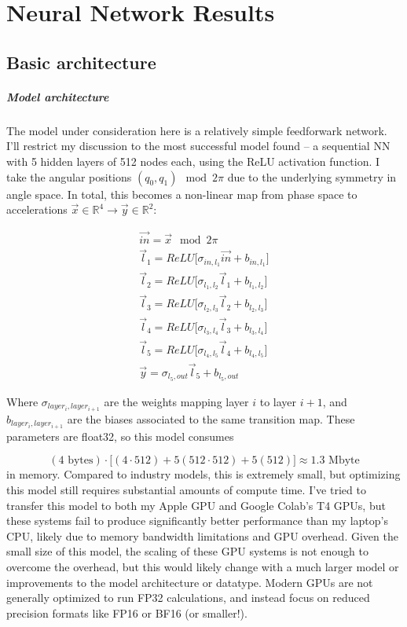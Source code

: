 \documentclass[]{article}
\begin{document}
\section{Neural Network Results}
\subsection{Basic architecture}
\subparagraph{Model architecture}
The model under consideration here is a relatively simple feedforwark network. I'll restrict my discussion to the most successful model found -- a sequential NN with 5 hidden layers of 512 nodes each, using the ReLU activation function. I take the angular positions $(q_0,q_1) \mod{2\pi}$ due to the underlying symmetry in angle space. In total, this becomes a non-linear map from phase space to accelerations $\vec{x}\in\mathbb{R}^4 \to \vec{y}\in\mathbb{R}^2$:

\begin{eqnarray*}
	\vec{in} = \vec{x} \mod{2\pi} \\
	\vec{l}_1 = ReLU\Big[\sigma_{in,l_1}\vec{in} + b_{in,l_1} \Big] \\
	\vec{l}_2 = ReLU\Big[\sigma_{l_1,l_2}\vec{l}_1 + b_{l_1,l_2} \Big] \\
	\vec{l}_3 = ReLU\Big[\sigma_{l_2,l_3}\vec{l}_2+ b_{l_2,l_3} \Big] \\
	\vec{l}_4 = ReLU\Big[\sigma_{l_3,l_4}\vec{l}_3+ b_{l_3,l_4} \Big] \\
	\vec{l}_5 = ReLU\Big[\sigma_{l_4,l_5}\vec{l}_4+ b_{l_4,l_5} \Big] \\
	\vec{y} = \sigma_{l_5,out} \vec{l}_5 + b_{l_5,out}
\end{eqnarray*}

Where $\sigma_{layer_i,layer_{i+1}}$ are the weights mapping layer $i$ to layer $i+1$, and $b_{layer_i,layer_{i+1}}$ are the biases associated to the same transition map. These parameters are float32, so this model consumes

\begin{equation}
	(4 \text{ bytes})\cdot\Big[ (4\cdot512) + 5(512\cdot512) + 5(512) \Big] \approx 1.3\text{ Mbyte}
\end{equation}
 in memory. Compared to industry models, this is extremely small, but optimizing this model still requires substantial amounts of compute time. I've tried to transfer this model to both my Apple GPU and Google Colab's T4 GPUs, but these systems fail to produce significantly better performance than my laptop's CPU, likely due to memory bandwidth limitations and GPU overhead. Given the small size of this model, the scaling of these GPU systems is not enough to overcome the overhead, but this would likely change with a much larger model or improvements to the model architecture or datatype. Modern GPUs are not generally optimized to run FP32 calculations, and instead focus on reduced precision formats like FP16 or BF16 (or smaller!). 
 
\end{document}
